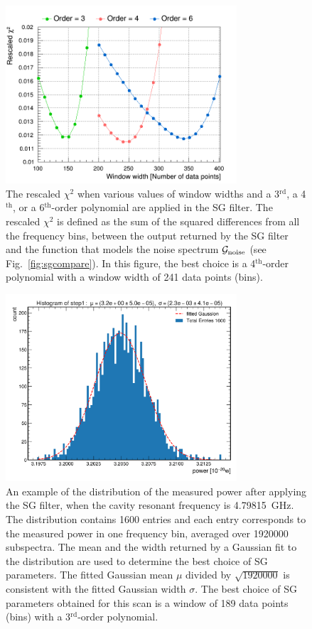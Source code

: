 \documentclass[%
reprint, %
superscriptaddress,
 amsmath,amssymb,
 aps
]{revtex4-2}
\begin{document}
\begin{figure} [htbp]
  \centering
  \includegraphics[width=8.6cm]{Figure8.png}
  \caption{The rescaled $\chi^2$ when various values of window widths and 
  a 3$^\text{rd}$, a 4$^\text{th}$, or a 6$^\text{th}$-order polynomial 
  are applied in the SG filter. The rescaled $\chi^2$ is defined as 
  the sum of the squared differences  
  from all the frequency bins, between the output returned by the SG filter 
  and the function that models the noise spectrum ${\cal G}_\text{noise}$ 
  (see Fig.~\ref{fig:sgcompare}).  
  In this 
  figure, the best choice is a 4$^\text{th}$-order polynomial with 
  a window width of 241 data points (bins). }
  \label{fig:sgoptimize}
\end{figure}
 


\begin{figure} [htbp]
  \centering
  \includegraphics[width=8.6cm]{Figure9.png}
  \caption{An example of the distribution of the measured power after 
applying the SG filter, when 
the cavity resonant frequency is 4.79815~GHz. The distribution contains 
1600 entries and each entry corresponds to the measured power 
in one frequency bin, averaged
over 1920000 subspectra. The mean and the width returned by 
a Gaussian fit to the distribution are used to determine the best choice of 
SG parameters. The fitted Gaussian mean $\mu$ divided by 
$\sqrt{1920000}$ is consistent 
with the fitted Gaussian width $\sigma$. The best choice of SG parameters 
obtained for this scan is a window of 189 data points (bins) with a 
3$^\text{rd}$-order polynomial. 
}
  \label{fig:noisegauss}
\end{figure}
 
\end{document}
